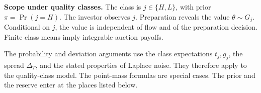 
\protect{}\label{oa-a-quality-class-scope}
\noindent\textbf{Scope under quality classes.}
The class is \(j\in\{H,L\}\), with prior \(\pi=\Pr(j=H)\).
The investor observes \(j\).
Preparation reveals the value \(\theta\sim G_j\).
Conditional on \(j\), the value is independent of flow and of the preparation decision.
Finite class means imply integrable auction payoffs.
\par
The probability and deviation arguments use the class expectations
\(t_j,g_j\), the spread \(\Delta_T\), and the stated properties of Laplace noise.
They therefore apply to the quality-class model.
The point-mass formulas are special cases.
The prior and the reserve enter at the places listed below.

